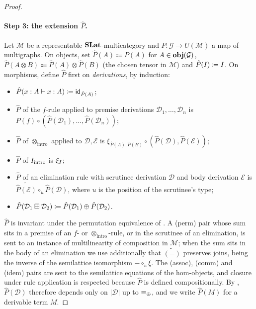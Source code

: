 \begin{proof}
\paragraph{Step 3: the extension $\hat{P}$.}
Let $\mathcal{M}$ be a representable $\mathbf{SLat}$-multicategory and $P : \mathcal{G} \to U(\mathcal{M})$ a map of multigraphs.
On objects, set $\hat{P}(A) \Coloneqq P(A)$ for $A \in {\mathbf{obj}(\mathcal{G})}$, $\hat{P}(A \otimes B) \Coloneqq \hat{P}(A) \otimes \hat{P}(B)$ (the chosen tensor in $\mathcal{M}$) and $\hat{P}(I) \mathrel{\vcentcolon\mathrel{\mkern-1.2mu}=} I$.
On morphisms, define $\hat{P}$ first on \emph{derivations}, by induction:
\begin{itemize}
  \item $\hat{P}(x : A \vdash x : A) \mathrel{\vcentcolon\mathrel{\mkern-1.2mu}=} \textsf{id}_{\hat{P}(A)}$;
  \item $\hat{P}$ of the $f$-rule applied to premise derivations $\mathcal{D}_1, \ldots, \mathcal{D}_n$ is $P(f) \circ (\hat{P}(\mathcal{D}_1), \ldots, \hat{P}(\mathcal{D}_n))$;
  \item $\hat{P}$ of $\otimes_{\text{intro}}$ applied to $\mathcal{D}, \mathcal{E}$ is $\xi_{\hat{P}(A), \hat{P}(B)} \circ (\hat{P}(\mathcal{D}), \hat{P}(\mathcal{E}))$;
  \item $\hat{P}$ of $I_{\text{intro}}$ is $\xi_{I}$;
  \item $\hat{P}$ of an elimination rule with scrutinee derivation $\mathcal{D}$ and body derivation $\mathcal{E}$ is $\widetilde{\hat{P}(\mathcal{E})} \circ_u \hat{P}(\mathcal{D})$, where $u$ is the position of the scrutinee's type;
  \item $\hat{P}(\mathcal{D}_1 \boxplus \mathcal{D}_2) \mathrel{\vcentcolon\mathrel{\mkern-1.2mu}=} \hat{P}(\mathcal{D}_1) \mathbin{\oplus} \hat{P}(\mathcal{D}_2)$.
\end{itemize}
$\hat{P}$ is invariant under the permutation equivalence of .
A (perm) pair whose sum sits in a premise of an $f$- or $\otimes_{\text{intro}}$-rule, or in the scrutinee of an elimination, is sent to an instance of multilinearity of composition in $\mathcal{M}$; when the sum sits in the body of an elimination we use additionally that $\widetilde{(-)}$ preserves joins, being the inverse of the semilattice isomorphism $- \circ_u \xi$.
The (assoc), (comm) and (idem) pairs are sent to the semilattice equations of the hom-objects, and closure under rule application is respected because $\hat{P}$ is defined compositionally.
By , $\hat{P}(\mathcal{D})$ therefore depends only on $|\mathcal{D}|$ up to $\equiv_{\mathbin{\oplus}}$, and we write $\hat{P}(M)$ for a derivable term $M$.


\end{proof}
